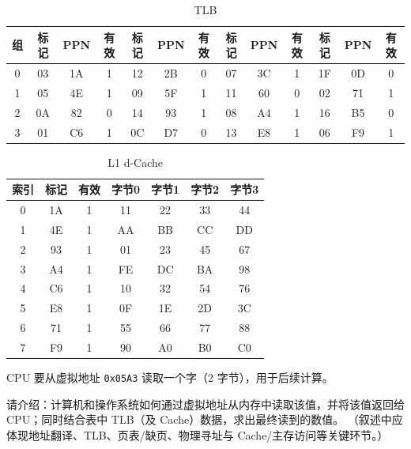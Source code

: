 \documentclass[11pt,a4paper]{ctexart}
\begin{document}
\begin{enumerate}[resume]
\begin{table}[htbp]
\centering
\caption{TLB}
\label{tab:tlb}
\scriptsize
\renewcommand{\arraystretch}{1.15}
\begin{tabular}{|c|c|c|c|c|c|c|c|c|c|c|c|c|}
\hline
组 & 标记 & PPN & 有效 & 标记 & PPN & 有效 & 标记 & PPN & 有效 & 标记 & PPN & 有效 \\
\hline
0 & 03 & 1A & 1 & 12 & 2B & 0 & 07 & 3C & 1 & 1F & 0D & 0 \\
1 & 05 & 4E & 1 & 09 & 5F & 1 & 11 & 60 & 0 & 02 & 71 & 1 \\
2 & 0A & 82 & 0 & 14 & 93 & 1 & 08 & A4 & 1 & 16 & B5 & 0 \\
3 & 01 & C6 & 1 & 0C & D7 & 0 & 13 & E8 & 1 & 06 & F9 & 1 \\
\hline
\end{tabular}
\end{table}

\begin{table}[htbp]
\centering
\caption{L1 d-Cache}
\label{tab:cache}
\small
\renewcommand{\arraystretch}{1.15}
\begin{tabular}{|c|c|c|c|c|c|c|}
\hline
索引 & 标记 & 有效 & 字节0 & 字节1 & 字节2 & 字节3 \\
\hline
0 & 1A & 1 & 11 & 22 & 33 & 44 \\
1 & 4E & 1 & AA & BB & CC & DD \\
2 & 93 & 1 & 01 & 23 & 45 & 67 \\
3 & A4 & 1 & FE & DC & BA & 98 \\
4 & C6 & 1 & 10 & 32 & 54 & 76 \\
5 & E8 & 1 & 0F & 1E & 2D & 3C \\
6 & 71 & 1 & 55 & 66 & 77 & 88 \\
7 & F9 & 1 & 90 & A0 & B0 & C0 \\
\hline
\end{tabular}
\end{table}

CPU 要从虚拟地址 \texttt{0x05A3} 读取一个字（2 字节），用于后续计算。

请介绍：计算机和操作系统如何通过虚拟地址从内存中读取该值，并将该值返回给 CPU；同时结合表中 TLB（及 Cache）数据，求出最终读到的数值。
（叙述中应体现地址翻译、TLB、页表/缺页、物理寻址与 Cache/主存访问等关键环节。）

\vspace{6em}

\end{enumerate}
\end{document}
